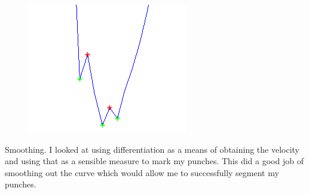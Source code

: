 \begin{figure}[h]
\hspace{0.5cm}
\begin{minipage}{6.0cm}
    \centering
    \label{fig:kinect2}
\end{minipage}
\begin{minipage}{3.5cm}
    \centering
    \includegraphics[height=0.15\textheight]{fig04/fig05}
    \label{fig:kinect3}
\end{minipage}
\end{figure}


Smoothing.
I looked at using differentiation as a means of obtaining the velocity and using that as a sensible measure to mark my punches. This did a good job of smoothing out the curve which would allow me to successfully segment my punches. 


